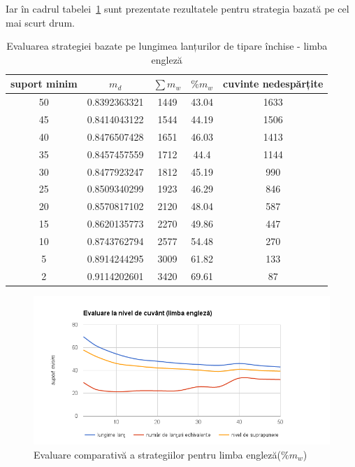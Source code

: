 Iar în cadrul tabelei~\ref{table:shortest_en} sunt prezentate rezultatele pentru strategia bazată pe cel mai scurt drum. 

\begin{table}[h!]
\centering
\begin{tabular}{|c|c|c|c|c|}
\hline
suport minim & $m_d$ & $\sum m_w$ & $\%{m_w}$ & cuvinte nedespărțite\\  
\hline
\hline
50	& 0.8392363321 &	1449 &	43.04 &	1633 \\
\hline
45 & 0.8414043122 &	1544 &	44.19 &	1506 \\
\hline
40 &	0.8476507428 &	1651 &	46.03 &	1413 \\
\hline
35 &	0.8457457559 &	1712 &	44.4 &	1144 \\
\hline
30 & 0.8477923247 &	1812 &	45.19 &	990 \\
\hline
25 &	0.8509340299 &	1923 &	46.29 &	846 \\
\hline
20 &	0.8570817102 &	2120 &	48.04 &	587 \\
\hline
15 &	0.8620135773 &	2270 &	49.86 &	447 \\
\hline
10 &	0.8743762794 &	2577 &	54.48 &	270 \\
\hline
5 &	0.8914244295 &	3009 &	61.82 &	133 \\
\hline
2 &	0.9114202601 &	3420 &	69.61 &	87 \\
\hline\end{tabular}
\caption{Evaluarea strategiei bazate pe lungimea lanțurilor de tipare închise - limba engleză} 
\label{table:shortest_en}
\end{table}

\begin{figure}[h!]
    \centering
    \includegraphics[width=1\textwidth]{figures/strategies-word-en.png}
    \caption{Evaluare comparativă a strategiilor pentru limba engleză($\%m_w$)}
    \label{fig:strategies-word-en}
\end{figure}

